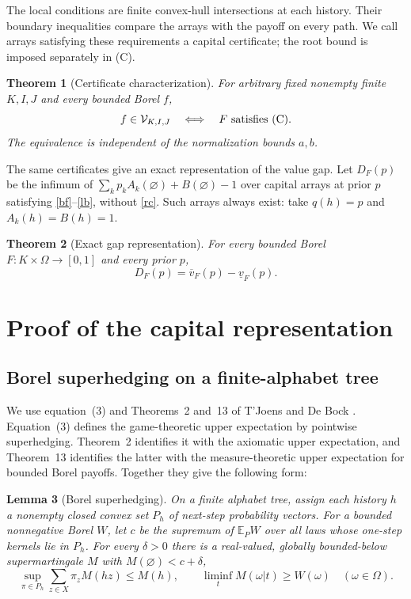 \documentclass[11pt,a4paper]{article}
\newtheorem{theorem}{Theorem}[section]
\newtheorem{lemma}[theorem]{Lemma}
\theoremstyle{definition}
\theoremstyle{remark}
\newcommand{\E}{\mathbb E}
\newcommand{\lv}{\underline v}
\newcommand{\uv}{\overline v}
\begin{document}
The local conditions are finite convex-hull intersections at each
history. Their boundary inequalities compare the arrays with the payoff
on every path. We call arrays satisfying these requirements a capital
certificate; the root bound is imposed separately in (C).

\begin{theorem}[Certificate characterization]\label{main}
For arbitrary fixed nonempty finite $K,I,J$ and every bounded Borel $f$,
\[
 f\in\mathcal V_{K,I,J}\quad\Longleftrightarrow\quad
 F\text{ satisfies \textup{(C)}}.
\]
The equivalence is independent of the normalization bounds $a,b$.
\end{theorem}

The same certificates give an exact representation of the value gap.
Let $D_F(p)$ be the infimum of
$\sum_k p_k A_k(\varnothing)+B(\varnothing)-1$ over capital arrays at prior $p$
satisfying \eqref{bf}--\eqref{lb}, without \eqref{rc}. Such arrays always
exist: take $q(h)=p$ and $A_k(h)=B(h)=1$.

\begin{theorem}[Exact gap representation]\label{rep}
For every bounded Borel $F:K\times\Omega\to[0,1]$ and every prior $p$,
\[
 D_F(p)=\uv_F(p)-\lv_F(p).
\]
\end{theorem}

\section{Proof of the capital representation}\label{sec:capitalproof}
\subsection{Borel superhedging on a finite-alphabet tree}


We use equation~(3) and Theorems~2 and~13 of T'Joens and De Bock
\cite{TDB}. Equation~(3) defines the game-theoretic upper expectation
by pointwise superhedging. Theorem~2 identifies it with the axiomatic
upper expectation, and Theorem~13 identifies the latter with the
measure-theoretic upper expectation for bounded Borel payoffs.
Together they give the following form:

\begin{lemma}[Borel superhedging]\label{duality}
On a finite alphabet tree, assign each history $h$ a nonempty closed
convex set $P_h$ of next-step probability vectors. For a bounded
nonnegative Borel $W$, let $c$ be the supremum of $\E_P W$ over all laws
whose one-step kernels lie in $P_h$. For every $\delta>0$ there is a
real-valued, globally bounded-below supermartingale $M$ with $M(\varnothing)<c+\delta$,
\[
 \sup_{\pi\in P_h}\sum_{z\in X}\pi_z M(hz)\leq M(h),
 \qquad
 \liminf_t M(\omega|t)\geq W(\omega)\quad(\omega\in\Omega).
\]
\end{lemma}
\end{document}
